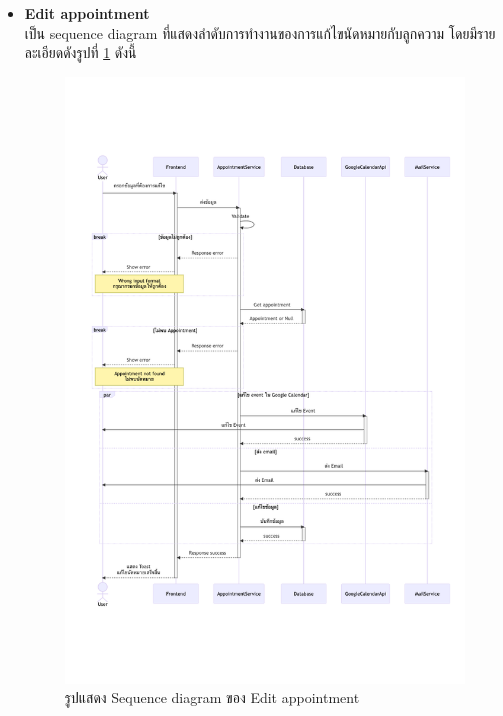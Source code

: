\documentclass[12pt,oneside,openright,a4paper]{cpe-thai-project}
\begin{document}
\begin{itemize}
    \newpage
    \item \textbf{Edit appointment} \\
    เป็น sequence diagram ที่แสดงลำดับการทำงานของการแก้ไขนัดหมายกับลูกความ โดยมีรายละเอียดดังรูปที่ \ref{fig:sqEditEvent} ดังนี้
    \begin{figure}[!ht]\centering
        \includegraphics[width=15cm, trim={1cm 5cm 0.5cm 5cm},clip]{./assets/sequence-diagram/edit-event.png}
        \caption{รูปแสดง Sequence diagram ของ Edit appointment}\label{fig:sqEditEvent}
    \end{figure}


\end{itemize}
\end{document}
